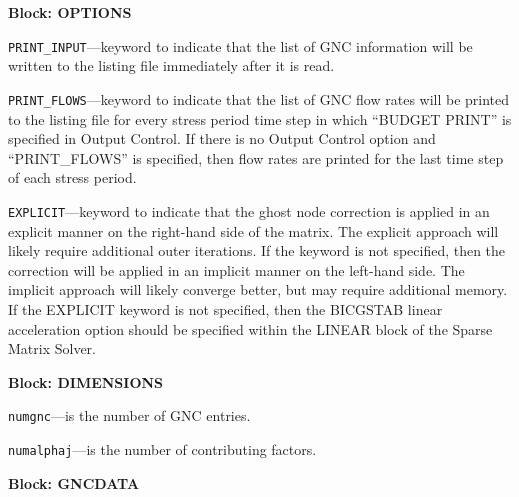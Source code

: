 
\item \textbf{Block: OPTIONS}

\begin{description}
\item \texttt{PRINT\_INPUT}---keyword to indicate that the list of GNC information will be written to the listing file immediately after it is read.

\item \texttt{PRINT\_FLOWS}---keyword to indicate that the list of GNC flow rates will be printed to the listing file for every stress period time step in which ``BUDGET PRINT'' is specified in Output Control.  If there is no Output Control option and ``PRINT\_FLOWS'' is specified, then flow rates are printed for the last time step of each stress period.

\item \texttt{EXPLICIT}---keyword to indicate that the ghost node correction is applied in an explicit manner on the right-hand side of the matrix.  The explicit approach will likely require additional outer iterations.  If the keyword is not specified, then the correction will be applied in an implicit manner on the left-hand side.  The implicit approach will likely converge better, but may require additional memory.  If the EXPLICIT keyword is not specified, then the BICGSTAB linear acceleration option should be specified within the LINEAR block of the Sparse Matrix Solver.

\end{description}
\item \textbf{Block: DIMENSIONS}

\begin{description}
\item \texttt{numgnc}---is the number of GNC entries.

\item \texttt{numalphaj}---is the number of contributing factors.

\end{description}
\item \textbf{Block: GNCDATA}

